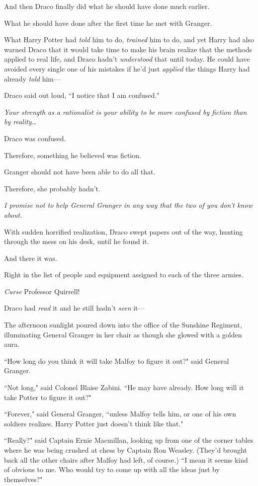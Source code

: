 And then Draco finally did what he should have done much earlier.

What he should have done after the first time he met with Granger.

What Harry Potter had \emph{told} him to do, \emph{trained} him to do, and yet Harry had also warned Draco that it would take time to make his brain realize that the methods applied to real life, and Draco hadn't \emph{understood} that until today. He could have avoided every single one of his mistakes if he'd just \emph{applied} the things Harry had already \emph{told} him—

Draco said out loud, ``I notice that I am confused."

\emph{Your strength as a rationalist is your ability to be more confused by fiction than by reality{\ldots}}

Draco was confused.

Therefore, something he believed was fiction.

Granger should not have been able to do all that.

Therefore, she probably hadn't.

\emph{I promise not to help General Granger in any way that the two of you don't know about.}

With sudden horrified realization, Draco swept papers out of the way, hunting through the mess on his desk, until he found it.

And there it was.

Right in the list of people and equipment assigned to each of the three armies.

\emph{Curse} Professor Quirrell!

Draco had \emph{read} it and he still hadn't \emph{seen} it—

\later

The afternoon sunlight poured down into the office of the Sunshine Regiment, illuminating General Granger in her chair as though she glowed with a golden aura.

``How long do you think it will take Malfoy to figure it out?" said General Granger.

``Not long," said Colonel Blaise Zabini. ``He may have already. How long will it take Potter to figure it out?"

``Forever," said General Granger, ``unless Malfoy tells him, or one of his own soldiers realizes. Harry Potter just doesn't think like that."

``Really?" said Captain Ernie Macmillan, looking up from one of the corner tables where he was being crushed at chess by Captain Ron Weasley. (They'd brought back all the other chairs after Malfoy had left, of course.) ``I mean it seems kind of obvious to me. Who would try to come up with all the ideas just by themselves?"

